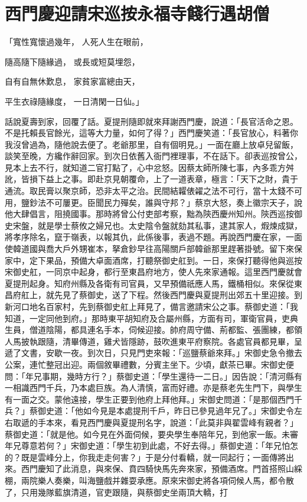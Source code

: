 %

\chapter{西門慶迎請宋巡按\KG 永福寺餞行遇胡僧}

「寬性寬懷過幾年，  人死人生在眼前，

隨高隨下隨緣過，  或長或短莫埋怨，

自有自無休歎息，  家貧家富總由天，

平生衣祿隨緣度，  一日清閑一日仙。」

話說夏壽到家，回覆了話。夏提刑隨即就來拜謝西門慶，說道：「長官活命之恩。不是托賴長官餘光，這等大力量，如何了得？」西門慶笑道：「長官放心，料著你我沒曾過為，隨他說去便了。老爺那里，自有個明見。」一面在廳上放卓兒留飯，談笑至晚，方纔作辭回家。到次日依舊入衙門裡理事，不在話下。卻表巡按曾公，見本上去不行，就知道二官打點了，心中忿怒。因蔡太師所陳七事，內多乖方舛訛，皆損下益上之事。即赴京見朝覆命，上了一道表章，極言：「天下之財，貴于通流。取民膏以聚京師，恐非太平之治。民間結糶俵糴之法不可行，當十太錢不可用，鹽鈔法不可屢更。臣聞民力殫矣，誰與守邦？」蔡京大怒，奏上徽宗天子，說他大肆倡言，阻撓國事。那時將曾公付吏部考察，黜為陝西慶州知州。陝西巡按御史宋盤，就是學士蔡攸之婦兄也。太史陰令盤就劾其私事，逮其家人，煆煉成獄，將孝序除名，竄于嶺表，以報其仇，此係後事，表過不題。再說西門慶在家，一面使韓道國與喬大戶外甥崔本，拏倉鈔早往高陽關戶部韓爺那里趕著掛號。留下來保家中，定下果品，預備大卓面酒席，打聽祭御史舡到。一日，來保打聽得他與巡按宋御史舡，一同京中起身，都行至東昌府地方，使人先來家通報。這里西門慶就會夏提刑起身。知府州縣及各衛有司官員，又早預備祇應人馬，鐵桶相似。來保從東昌府舡上，就先見了蔡御史，送了下程。然後西門慶與夏提刑出郊五十里迎接。到新河口地名百家村，先到蔡御史舡上拜見了，備言邀請宋公之事。蔡御史道：「我知道，一定同他到府。」那時東平胡知府及合屬州縣，方面有司，軍衛官員，吏典生員，僧道陰陽，都具連名手本，伺候迎接。帥府周守備、荊都監、張團練，都領人馬披執跟隨，清畢傳道，雞犬皆隱跡，鼓吹進東平府察院。各處官員都見畢，呈遞了文書，安歇一夜。到次日，只見門吏來報：「巡鹽蔡爺來拜。」宋御史急令撤去公案，連忙整冠出迎。兩個敘畢禮數，分賓主坐下。少頃，獻茶已畢。宋御史便問：「年兄事期，幾時方行？」蔡御史道：「學生還待一二日。」因告說：「清河縣有一相識西門千兵，乃本處巨族。為人清慎，富而好禮。亦是蔡老先生門下，與學生有一面之交。蒙他遠接，學生正要到他府上拜他拜。」宋御史問道：「是那個西門千兵？」蔡御史道：「他如今見是本處提刑千戶，昨日已參見過年兄了。」宋御史令左右取遞的手本來，看見西門慶與夏提刑名字，說道：「此莫非與翟雲峰有親者？」蔡御史道：「就是他。如今見在外面伺候，要央學生奉陪年兄，到他家一飯。未審年兄尊意若何？」宋御史道：「學生初到此處，不好去得。」蔡御史道：「年兄怕怎的？既是雲峰分上，你我走走何害？」于是分付看轎，就一同起行；一面傳將出來。西門慶知了此消息，與來保、賁四騎快馬先奔來家，預備酒席。門首搭照山綵棚，兩院樂人奏樂，叫海鹽戲并雜耍承應。原來宋御史將各項伺候人馬，都令散了，只用幾隊藍旗清道，官吏跟隨，與蔡御史坐兩頂大轎，打